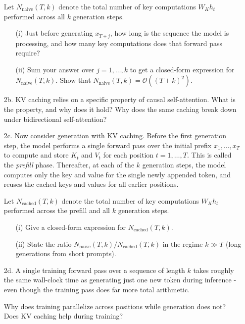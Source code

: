 \documentclass[submit]{harvardml}
\begin{document}
\begin{framed}
\begin{enumerate}
  Let $N_{\text{naive}}(T, k)$ denote the total number of key computations $W_K h_t$ performed across all $k$ generation steps.
  
  \begin{enumerate}
    \item[(i)] Just before generating $x_{T+j}$, how long is the sequence the model is processing, and how many key computations does that forward pass require?
    \item[(ii)] Sum your answer over $j = 1, \ldots, k$ to get a closed-form expression for $N_{\text{naive}}(T, k)$. Show that $N_{\text{naive}}(T, k) = \mathcal{O}((T+k)^2)$.
  \end{enumerate}
  
  \item[2b.] KV caching relies on a specific property of causal self-attention. What is the property, and why does it hold? Why does the same caching break down under bidirectional self-attention?
  
  \item[2c.] Now consider generation with KV caching. Before the first generation step, the model performs a single forward pass over the initial prefix $x_1, \ldots, x_T$ to compute and store $K_t$ and $V_t$ for each position $t = 1, \ldots, T$. This is called the \emph{prefill} phase. Thereafter, at each of the $k$ generation steps, the model computes only the key and value for the single newly appended token, and reuses the cached keys and values for all earlier positions.
  
  Let $N_{\text{cached}}(T, k)$ denote the total number of key computations $W_K h_t$ performed across the prefill and all $k$ generation steps.
  
  \begin{enumerate}
    \item[(i)] Give a closed-form expression for $N_{\text{cached}}(T, k)$.
    \item[(ii)] State the ratio $N_{\text{naive}}(T, k) / N_{\text{cached}}(T, k)$ in the regime $k \gg T$ (long generations from short prompts).
  \end{enumerate}
  
  \item[2d.] A single training forward pass over a sequence of length $k$ takes roughly the same wall-clock time as generating just one new token during inference - even though the training pass does far more total arithmetic.
  
  Why does training parallelize across positions while generation does not? Does KV caching help during training?
\end{enumerate}
\end{framed}
\end{document}
